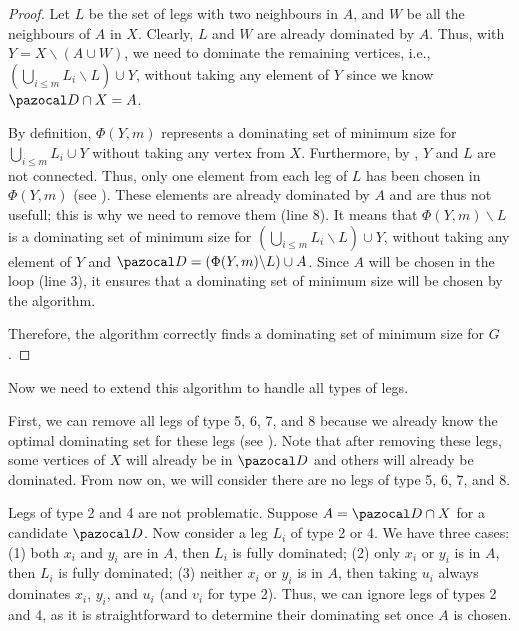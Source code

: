 \begin{proof}
    Let $L$ be the set of legs with two neighbours in $A$, and $W$ be all the neighbours of $A$ in $X$. Clearly, $L$ and $W$ are already dominated by $A$. Thus, with $Y = X \backslash (A \cup W)$, we need to dominate the remaining vertices, i.e., $(\bigcup_{i \leq m} L_i \backslash L) \cup Y$, without taking any element of $Y$ since we know $\D \cap X = A$.
    
    By definition, $\Phi(Y, m)$ represents a dominating set of minimum size for $\bigcup_{i \leq m} L_i \cup Y$ without taking any vertex from $X$. Furthermore, by , $Y$ and $L$ are not connected. Thus, only one element from each leg of $L$ has been chosen in $\Phi(Y, m)$ (see ). These elements are already dominated by $A$ and are thus not usefull; this is why we need to remove them (line 8). It means that $\Phi(Y, m) \backslash L$ is a dominating set of minimum size for $(\bigcup_{i \leq m} L_i \backslash L) \cup Y$, without taking any element of $Y$ and $\D = (\Phi(Y, m) \backslash L) \cup A$. Since $A$ will be chosen in the loop (line 3), it ensures that a dominating set of minimum size will be chosen by the algorithm.

    Therefore, the algorithm correctly finds a dominating set of minimum size for $G$.

    
\end{proof}

Now we need to extend this algorithm to handle all types of legs.

\medskip

First, we can remove all legs of type 5, 6, 7, and 8 because we already know the optimal dominating set for these legs (see ). Note that after removing these legs, some vertices of $X$ will already be in $\D$ and others will already be dominated. From now on, we will consider there are no legs of type 5, 6, 7, and 8.

\medskip

Legs of type 2 and 4 are not problematic. Suppose $A = \D \cap X$ for a candidate $\D$. Now consider a leg $L_i$ of type 2 or 4. We have three cases: (1) both $x_i$ and $y_i$ are in $A$, then $L_i$ is fully dominated; (2) only $x_i$ or $y_i$ is in $A$, then $L_i$ is fully dominated; (3) neither $x_i$ or $y_i$ is in $A$, then taking $u_i$ always dominates $x_i$, $y_i$, and $u_i$ (and $v_i$ for type 2). Thus, we can ignore legs of types 2 and 4, as it is straightforward to determine their dominating set once $A$ is chosen.

